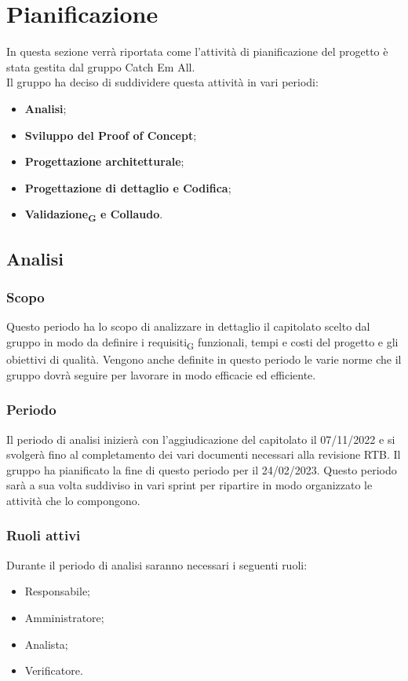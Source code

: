 \section{Pianificazione}
In questa sezione verrà riportata come l'attività di pianificazione del progetto è stata gestita dal gruppo Catch Em All. \\
Il gruppo ha deciso di suddividere questa attività in vari periodi:
\begin{itemize}
	\item \textbf{Analisi};
	\item \textbf{Sviluppo del Proof of Concept};
	\item \textbf{Progettazione architetturale};
    \item \textbf{Progettazione di dettaglio e Codifica};
	\item \textbf{Validazione\textsubscript{G} e Collaudo}.
\end{itemize}

\subsection{Analisi}
\subsubsection{Scopo}
Questo periodo ha lo scopo di analizzare in dettaglio il capitolato scelto dal gruppo in modo da definire i requisiti\textsubscript{G} funzionali, tempi e costi del progetto e gli obiettivi di qualità. Vengono anche definite in questo periodo le varie norme che il gruppo dovrà seguire per lavorare in modo efficacie ed efficiente.

\subsubsection{Periodo}
Il periodo di analisi inizierà con l'aggiudicazione del capitolato il 07/11/2022 e si svolgerà fino al completamento dei vari documenti necessari alla revisione  RTB. Il gruppo ha pianificato la fine di questo periodo per il 24/02/2023. Questo periodo sarà a sua volta suddiviso in vari sprint per ripartire in modo organizzato le attività che lo compongono.

\subsubsection{Ruoli attivi}
Durante il periodo di analisi saranno necessari i seguenti ruoli:
\begin{itemize}
	\item Responsabile;
	\item Amministratore;
	\item Analista;
	\item Verificatore.
\end{itemize}

